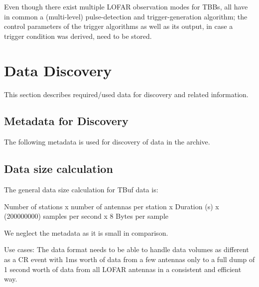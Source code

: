 \documentclass[a4paper,10pt,bibtotoc]{scrartcl}
\begin{document}
Even though there exist multiple LOFAR observation modes for TBBs, all
have in common a (multi-level) pulse-detection and trigger-generation algorithm;
the control parameters of the trigger algorithms as well as its output, in case
a trigger condition was derived, need to be stored.

\clearpage




\section{Data Discovery}
This section describes required/used data for discovery and related information.

\subsection{Metadata for Discovery}
The following metadata is used for discovery of data in the archive. %

\subsection{Data size calculation}

The general data size calculation for TBuf data is:

Number of stations x number of antennas per station x Duration (s) x (200000000) samples per second x 8 Bytes per sample

We neglect the metadata as it is small in comparison.


Use cases: The data format needs to be able to handle data volumes as different as a
CR event with 1ms worth of data from a few antennas only to a full dump of 1
second worth of data from all LOFAR antennas in a consistent and efficient way.
\end{document}
